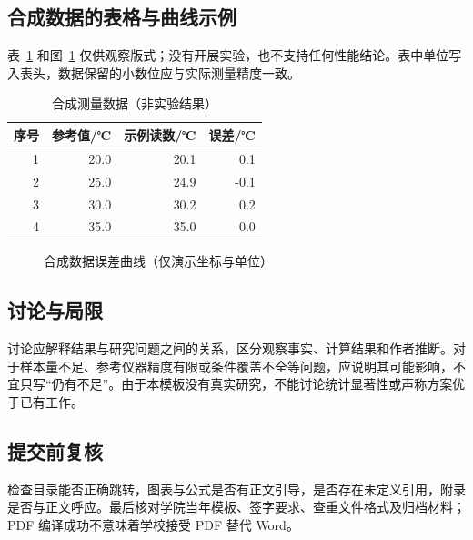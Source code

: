 \subsection{合成数据的表格与曲线示例}
表~\ref{tab:synthetic} 和图~\ref{fig:errors} 仅供观察版式；没有开展实验，也不支持任何性能结论。表中单位写入表头，数据保留的小数位应与实际测量精度一致。
\begin{table}[htbp]
\centering\caption{合成测量数据（非实验结果）}\label{tab:synthetic}
\begin{tabular}{rrrr}\toprule 序号 & 参考值/℃ & 示例读数/℃ & 误差/℃\\\midrule
1 &20.0&20.1&0.1\\2 &25.0&24.9&-0.1\\3 &30.0&30.2&0.2\\4 &35.0&35.0&0.0\\\bottomrule
\end{tabular}
\end{table}
\begin{figure}[htbp]\centering
{}
\caption{合成数据误差曲线（仅演示坐标与单位）}\label{fig:errors}
\end{figure}
\subsection{讨论与局限}
讨论应解释结果与研究问题之间的关系，区分观察事实、计算结果和作者推断。对于样本量不足、参考仪器精度有限或条件覆盖不全等问题，应说明其可能影响，不宜只写“仍有不足”。由于本模板没有真实研究，不能讨论统计显著性或声称方案优于已有工作。
\subsection{提交前复核}
检查目录能否正确跳转，图表与公式是否有正文引导，是否存在未定义引用，附录是否与正文呼应。最后核对学院当年模板、签字要求、查重文件格式及归档材料；PDF 编译成功不意味着学校接受 PDF 替代 Word。
